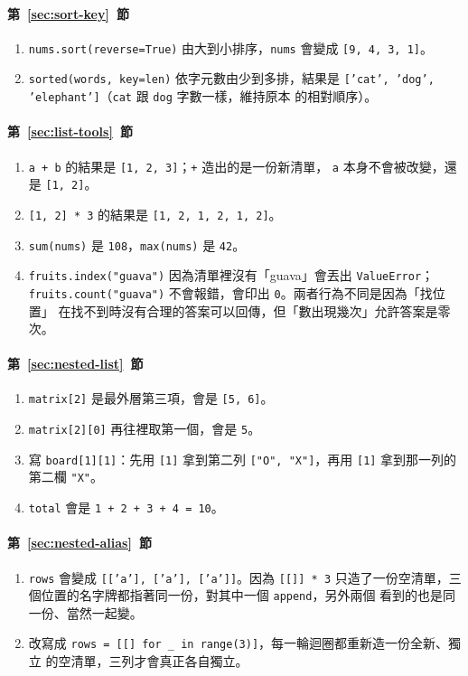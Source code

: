 \paragraph{第~\ref{sec:sort-key}~節}
\begin{enumerate}
\item \texttt{nums.sort(reverse=True)} 由大到小排序，\texttt{nums} 會變成
\texttt{[9, 4, 3, 1]}。
\item \texttt{sorted(words, key=len)} 依字元數由少到多排，結果是
\texttt{['cat', 'dog', 'elephant']}（\texttt{cat} 跟 \texttt{dog} 字數一樣，維持原本
的相對順序）。
\end{enumerate}

\paragraph{第~\ref{sec:list-tools}~節}
\begin{enumerate}
\item \texttt{a + b} 的結果是 \texttt{[1, 2, 3]}；\texttt{+} 造出的是一份新清單，
\texttt{a} 本身不會被改變，還是 \texttt{[1, 2]}。
\item \texttt{[1, 2] * 3} 的結果是 \texttt{[1, 2, 1, 2, 1, 2]}。
\item \texttt{sum(nums)} 是 \texttt{108}，\texttt{max(nums)} 是 \texttt{42}。
\item \texttt{fruits.index("guava")} 因為清單裡沒有「guava」會丟出 \texttt{ValueError}；
\texttt{fruits.count("guava")} 不會報錯，會印出 \texttt{0}。兩者行為不同是因為「找位置」
在找不到時沒有合理的答案可以回傳，但「數出現幾次」允許答案是零次。
\end{enumerate}

\paragraph{第~\ref{sec:nested-list}~節}
\begin{enumerate}
\item \texttt{matrix[2]} 是最外層第三項，會是 \texttt{[5, 6]}。
\item \texttt{matrix[2][0]} 再往裡取第一個，會是 \texttt{5}。
\item 寫 \texttt{board[1][1]}：先用 \texttt{[1]} 拿到第二列 \texttt{["O", "X"]}，再用
\texttt{[1]} 拿到那一列的第二欄 \texttt{"X"}。
\item \texttt{total} 會是 \texttt{1 + 2 + 3 + 4 = 10}。
\end{enumerate}

\paragraph{第~\ref{sec:nested-alias}~節}
\begin{enumerate}
\item \texttt{rows} 會變成 \texttt{[['a'], ['a'], ['a']]}。因為 \texttt{[[]] * 3}
只造了一份空清單，三個位置的名字牌都指著同一份，對其中一個 \texttt{append}，另外兩個
看到的也是同一份、當然一起變。
\item 改寫成 \texttt{rows = [[] for \_ in range(3)]}，每一輪迴圈都重新造一份全新、獨立
的空清單，三列才會真正各自獨立。
\end{enumerate}

